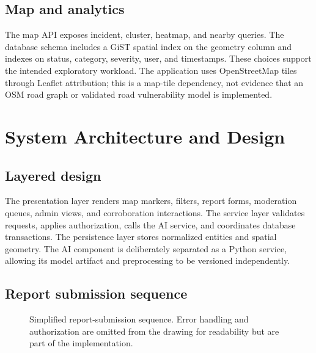 \documentclass[11pt]{article}
\begin{document}
\subsection{Map and analytics}

The map API exposes incident, cluster, heatmap, and nearby queries. The
database schema includes a GiST spatial index on the geometry column and
indexes on status, category, severity, user, and timestamps. These choices
support the intended exploratory workload. The application uses OpenStreetMap
tiles through Leaflet attribution; this is a map-tile dependency, not
evidence that an OSM road graph or validated road vulnerability model is
implemented.

\section{System Architecture and Design}
\label{sec:architecture}

\subsection{Layered design}

The presentation layer renders map markers, filters, report forms,
moderation queues, admin views, and corroboration interactions. The service
layer validates requests, applies authorization, calls the AI service, and
coordinates database transactions. The persistence layer stores normalized
entities and spatial geometry. The AI component is deliberately separated
as a Python service, allowing its model artifact and preprocessing to be
versioned independently.

\subsection{Report submission sequence}

\begin{figure}[H]
\centering
{}
\caption{Simplified report-submission sequence. Error handling and authorization are omitted from the drawing for readability but are part of the implementation.}
\label{fig:submission}
\end{figure}
\end{document}
